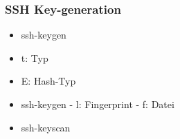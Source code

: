\begin{frame}
\frametitle{SSH Key-generation}
\begin{itemize}
\item ssh-keygen
\item t: Typ
\item E: Hash-Typ
\item ssh-keygen
  - l: Fingerprint
  - f: Datei 


\item ssh-keyscan
\end{itemize}
\end{frame}